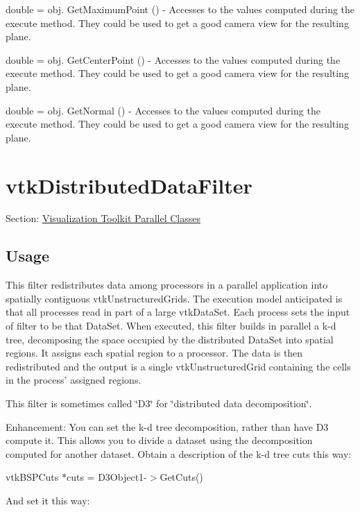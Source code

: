 \begin{DoxyItemize}
\item {\ttfamily double = obj. Get\-Maximum\-Point ()} -\/ Accesses to the values computed during the execute method. They could be used to get a good camera view for the resulting plane.  
\item {\ttfamily double = obj. Get\-Center\-Point ()} -\/ Accesses to the values computed during the execute method. They could be used to get a good camera view for the resulting plane.  
\item {\ttfamily double = obj. Get\-Normal ()} -\/ Accesses to the values computed during the execute method. They could be used to get a good camera view for the resulting plane.  
\end{DoxyItemize}\hypertarget{vtkparallel_vtkdistributeddatafilter}{}\section{vtk\-Distributed\-Data\-Filter}\label{vtkparallel_vtkdistributeddatafilter}
Section\-: \hyperlink{sec_vtkparallel}{Visualization Toolkit Parallel Classes} \hypertarget{vtkwidgets_vtkxyplotwidget_Usage}{}\subsection{Usage}\label{vtkwidgets_vtkxyplotwidget_Usage}
This filter redistributes data among processors in a parallel application into spatially contiguous vtk\-Unstructured\-Grids. The execution model anticipated is that all processes read in part of a large vtk\-Data\-Set. Each process sets the input of filter to be that Data\-Set. When executed, this filter builds in parallel a k-\/d tree, decomposing the space occupied by the distributed Data\-Set into spatial regions. It assigns each spatial region to a processor. The data is then redistributed and the output is a single vtk\-Unstructured\-Grid containing the cells in the process' assigned regions.

This filter is sometimes called \char`\"{}\-D3\char`\"{} for \char`\"{}distributed data decomposition\char`\"{}.

Enhancement\-: You can set the k-\/d tree decomposition, rather than have D3 compute it. This allows you to divide a dataset using the decomposition computed for another dataset. Obtain a description of the k-\/d tree cuts this way\-:

vtk\-B\-S\-P\-Cuts $\ast$cuts = D3\-Object1-\/$>$Get\-Cuts()

And set it this way\-:

